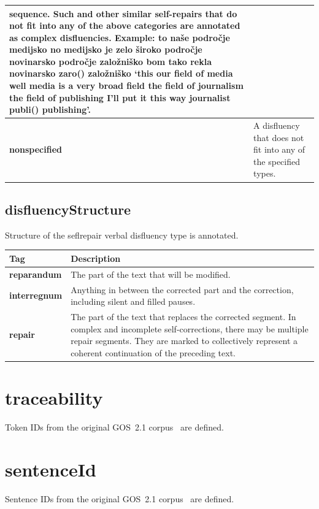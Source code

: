 \documentclass[a4paper,oneside,12pt]{article}
\begin{document}
\begin{longtable}{|l|p{12cm}|}
  sequence. Such and other similar self-repairs that do not fit into any of the
  above categories are annotated as complex disfluencies. Example: to naše
  področje medijsko no medijsko je zelo široko področje novinarsko področje
  založniško bom tako rekla novinarsko zaro() založniško `this our field of
  media well media is a very broad field the field of journalism the field of
  publishing I'll put it this way journalist publi() publishing'.                        \\
  \hline
  \textbf{nonspecified}            & A disfluency that does not fit into any of the
  specified types.                                                                       \\ \hline
\end{longtable}

\subsection{disfluencyStructure}
Structure of the seflrepair verbal disfluency type is annotated.
\begin{longtable}{|l|p{12cm}|}
  \hline
  \textbf{Tag}         & \textbf{Description}                                         \\
  \hline
  \endhead
  \textbf{reparandum}  & The part of the text that will be modified.                  \\ \hline
  \textbf{interregnum} & Anything in between the corrected part and the correction,
  including silent and filled pauses.                                                 \\
  \hline
  \textbf{repair}      & The part of the text that replaces the corrected segment. In
  complex and incomplete self-corrections, there may be multiple repair
  segments. They are marked to collectively represent a coherent continuation of
  the preceding text.                                                                 \\ \hline
\end{longtable}

\section{traceability}
Token IDs from the original GOS~2.1 corpus~\cite{verdonik2023} are defined.

\section{sentenceId}
Sentence IDs from the original GOS~2.1 corpus~\cite{verdonik2023} are defined.
\end{document}
